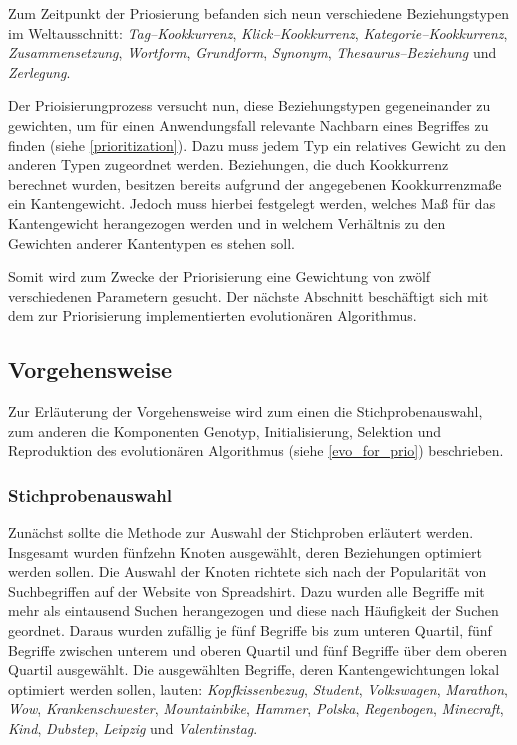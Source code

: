 Zum Zeitpunkt der Priosierung befanden sich neun verschiedene Beziehungstypen im Weltausschnitt: \emph{Tag--Kookkurrenz}, \emph{Klick--Kookkurrenz}, \emph{Kategorie--Kookkurrenz}, \emph{Zusammensetzung}, \emph{Wortform}, \emph{Grundform}, \emph{Synonym}, \emph{Thesaurus--Beziehung} und \emph{Zerlegung}.

Der Prioisierungprozess versucht nun, diese Beziehungstypen gegeneinander zu gewichten, um für einen Anwendungsfall relevante Nachbarn eines Begriffes zu finden (siehe \cref{prioritization}). Dazu muss jedem Typ ein relatives Gewicht zu den anderen Typen zugeordnet werden. Beziehungen, die duch Kookkurrenz berechnet wurden, besitzen bereits aufgrund der angegebenen Kookkurrenzmaße ein Kantengewicht. Jedoch muss hierbei festgelegt werden, welches Maß für das Kantengewicht herangezogen werden und in welchem Verhältnis zu den Gewichten anderer Kantentypen es stehen soll.

Somit wird zum Zwecke der Priorisierung eine Gewichtung von zwölf verschiedenen Parametern gesucht. Der nächste Abschnitt beschäftigt sich mit dem zur Priorisierung implementierten evolutionären Algorithmus.

\subsection{Vorgehensweise}
\label{evo_implementation}

Zur Erläuterung der Vorgehensweise wird zum einen die Stichprobenauswahl, zum anderen die Komponenten Genotyp, Initialisierung, Selektion und Reproduktion des evolutionären Algorithmus (siehe \cref{evo_for_prio}) beschrieben.

\subsubsection{Stichprobenauswahl}

Zunächst sollte die Methode zur Auswahl der Stichproben erläutert werden. Insgesamt wurden fünfzehn Knoten ausgewählt, deren Beziehungen optimiert werden sollen. Die Auswahl der Knoten richtete sich nach der Popularität von Suchbegriffen auf der Website von Spreadshirt. Dazu wurden alle Begriffe mit mehr als eintausend Suchen herangezogen und diese nach Häufigkeit der Suchen geordnet. Daraus wurden zufällig je fünf Begriffe bis zum unteren Quartil, fünf Begriffe zwischen unterem und oberen Quartil und fünf Begriffe über dem oberen Quartil ausgewählt. Die ausgewählten Begriffe, deren Kantengewichtungen lokal optimiert werden sollen, lauten: \emph{Kopfkissenbezug}, \emph{Student}, \emph{Volkswagen}, \emph{Marathon}, \emph{Wow}, \emph{Krankenschwester}, \emph{Mountainbike}, \emph{Hammer}, \emph{Polska}, \emph{Regenbogen}, \emph{Minecraft}, \emph{Kind}, \emph{Dubstep}, \emph{Leipzig} und \emph{Valentinstag}.

